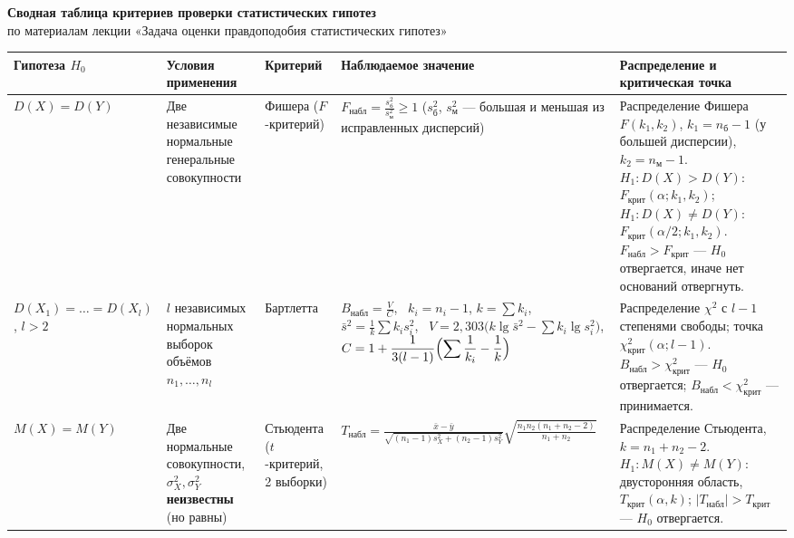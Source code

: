 \documentclass[a4paper,landscape,9pt]{extarticle}
\newcommand{\kr}{\text{крит}}
\newcommand{\nab}{\text{набл}}
\begin{document}
\begin{center}
{\large\bfseries Сводная таблица критериев проверки статистических гипотез}\\[1pt]
{\footnotesize по материалам лекции «Задача оценки правдоподобия статистических гипотез»}
\end{center}
\vspace{-2pt}
\small
\begin{tabular}{@{}P{2.4cm}P{3.7cm}P{2.7cm}P{6.3cm}P{9.3cm}@{}}
\toprule
\textbf{Гипотеза $H_0$} & \textbf{Условия применения} & \textbf{Критерий} & \textbf{Наблюдаемое значение} & \textbf{Распределение и критическая точка} \\
\midrule
$D(X)=D(Y)$ &
Две независимые нормальные генеральные совокупности &
Фишера ($F$-критерий) &
$\displaystyle F_{\nab}=\frac{s^2_{\text{б}}}{s^2_{\text{м}}}\ge 1$\newline
($s^2_{\text{б}}$, $s^2_{\text{м}}$ --- большая и меньшая из исправленных дисперсий) &
Распределение Фишера $F(k_1,k_2)$, $k_1=n_{\text{б}}-1$ (у большей дисперсии), $k_2=n_{\text{м}}-1$.\newline
$H_1: D(X)>D(Y)$: $F_{\kr}(\alpha;k_1,k_2)$; \ $H_1: D(X)\ne D(Y)$: $F_{\kr}(\alpha/2;k_1,k_2)$.\newline
$F_{\nab}>F_{\kr}$ --- $H_0$ отвергается, иначе нет оснований отвергнуть. \\
\midrule
$D(X_1)=\dots=D(X_l)$, $l>2$ &
$l$ независимых нормальных выборок объёмов $n_1,\dots,n_l$ &
Бартлетта &
$\displaystyle B_{\nab}=\frac{V}{C}$, \ $k_i=n_i-1$, $k=\sum k_i$,\newline
$\bar s^{2}=\frac1k\sum k_i s_i^2$, \ $V=2{,}303\bigl(k\lg\bar s^{2}-\sum k_i\lg s_i^2\bigr)$,\newline
$\displaystyle C=1+\frac{1}{3(l-1)}\Bigl(\sum\frac1{k_i}-\frac1k\Bigr)$ &
Распределение $\chi^2$ с $l-1$ степенями свободы; точка $\chi^2_{\kr}(\alpha;l-1)$.\newline
$B_{\nab}>\chi^2_{\kr}$ --- $H_0$ отвергается; $B_{\nab}<\chi^2_{\kr}$ --- принимается. \\
\midrule
$M(X)=M(Y)$ &
Две нормальные совокупности, $\sigma_X^2,\sigma_Y^2$ \textbf{неизвестны} (но равны) &
Стьюдента ($t$-критерий, 2 выборки) &
$\displaystyle T_{\nab}=\frac{\bar x-\bar y}{\sqrt{(n_1-1)s_X^2+(n_2-1)s_Y^2}}\sqrt{\frac{n_1n_2(n_1+n_2-2)}{n_1+n_2}}$ &
Распределение Стьюдента, $k=n_1+n_2-2$.\newline
$H_1: M(X)\ne M(Y)$: двусторонняя область, $T_{\kr}(\alpha,k)$; $|T_{\nab}|>T_{\kr}$ --- $H_0$ отвергается. \\

\end{tabular}
\end{document}
